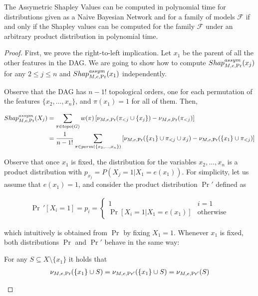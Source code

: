\begin{theorem}
    The Assymetric Shapley Values can be computed in polynomial time for distributions given as a Naive Bayesian Network and for a family of models $\mathcal{F}$ if and only if the Shapley values can be computed for the family $\mathcal{F}$ under an arbitrary product distribution in polynomial time.
\end{theorem}

\begin{proof}
    First, we prove the right-to-left implication. Let $x_1$ be the parent of all the other features in the DAG. We are going to show how to compute $Shap^{assym}_{M,e,\Pr}(x_j)$ for any $2 \leq j \leq n$ and $Shap^{assym}_{M,e,\Pr}(x_1)$ independently.

    Observe that the DAG has $n-1!$ topological orders, one for each permutation of the features $\{x_2, \ldots, x_n\}$, and $\pi(x_1) = 1$ for all of them. Then,

    \begin{align}\label{eq:assymetric_for_naive_child}
        Shap^{assym}_{M,e,\Pr}(X_j) &= \sum_{\pi \in topo(G)} w(\pi) \left[ \nu_{M,e,\Pr}(\pi_{<j} \cup \{x_j\}) 
        - \nu_{M,e,\Pr}(\pi_{<j}) \right] \nonumber \\
        &= \frac{1}{n-1!} \sum_{\pi \in perm(\{x_2, \ldots, x_n\})} \left[ \nu_{M,e,\Pr}(\{x_1\} \cup \pi_{<j} \cup {x_j}) - \nu_{M,e,\Pr}(\{x_1\} \cup \pi_{<j}) \right]
    \end{align}

    Observe that once $x_1$ is fixed, the distribution for the variables $x_2,\ldots, x_n$ is a product distribution with $p_{x_j} = P(X_j = 1 | X_1 = e(x_1) )$. For simplicity, let us assume that $e(x_1) = 1$, and consider the product distribution $\Pr'$ defined as

    \begin{align*}
        \Pr\,'[X_i = 1] = p_i = \begin{cases}
            1 & i = 1\\
            \Pr[X_i = 1 | X_1 = e(x_1)] & \text{otherwise}
        \end{cases}
    \end{align*}

    which intuitively is obtained from $\Pr$ by fixing $X_1 = 1$. Whenever $x_1$ is fixed, both distributions $\Pr$ and $\Pr'$ behave in the same way:
    
    \begin{lemma}\label{lemma:valuation_of_prob_function}
    For any $S \subseteq X \setminus \{x_1\}$ it holds that 
    \begin{align*}
        \nu_{M,e,\Pr}(\{x_1\} \cup S) = \nu_{M,e,\Pr'}(\{x_1\} \cup S) = \nu_{M,e,\Pr'}(S) 
    \end{align*}
      

\end{lemma}
\end{proof}

